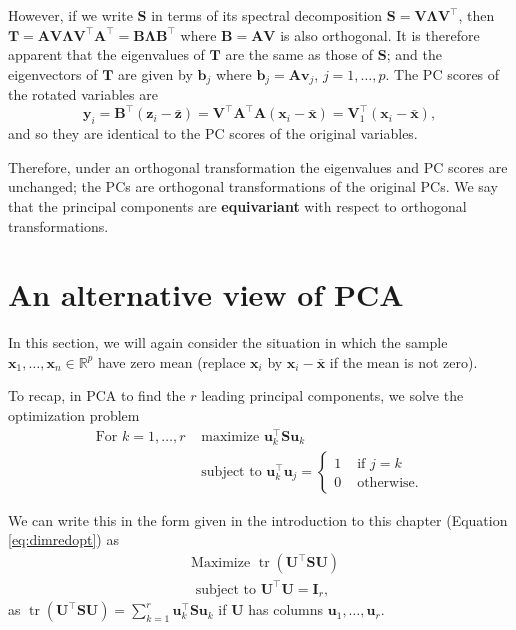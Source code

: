 \documentclass[]{book}
\theoremstyle{definition}
\theoremstyle{definition}
\theoremstyle{definition}
\theoremstyle{remark}
\begin{document}
However, if we write \(\mathbf S\) in terms of its spectral decomposition \(\mathbf S= \mathbf V\boldsymbol \Lambda\mathbf V^\top\), then \(\mathbf T= \mathbf A\mathbf V\boldsymbol \Lambda\mathbf V^\top \mathbf A^\top = \mathbf B\boldsymbol \Lambda\mathbf B^\top\) where \(\mathbf B= \mathbf A\mathbf V\) is also orthogonal. It is therefore apparent that the eigenvalues of \(\mathbf T\) are the same as those of \(\mathbf S\); and the eigenvectors of \(\mathbf T\) are given by \(\mathbf b_j\) where \(\mathbf b_j = \mathbf A\mathbf v_j\), \(j=1,\ldots,p\). The PC scores of the rotated variables are
\[ \mathbf y_i = \mathbf B^\top (\mathbf z_i - \bar{\mathbf z}) = \mathbf V^\top \mathbf A^\top \mathbf A(\mathbf x_i - \bar{\mathbf x}) = \mathbf V_1^\top (\mathbf x_i - \bar{\mathbf x}),\]
and so they are identical to the PC scores of the original variables.

Therefore, under an orthogonal transformation the eigenvalues and PC scores are unchanged; the PCs are orthogonal transformations of the original PCs. We say that the principal components are \textbf{equivariant} with respect to orthogonal transformations.

\hypertarget{an-alternative-view-of-pca}{%
\section{An alternative view of PCA}\label{an-alternative-view-of-pca}}

In this section, we will again consider the situation in which the sample \(\mathbf x_1, \ldots , \mathbf x_n \in \mathbb{R}^p\) have zero mean (replace \(\mathbf x_i\) by \(\mathbf x_i-\bar{\mathbf x}\) if the mean is not zero).

To recap, in PCA to find the \(r\) leading principal components, we solve the optimization problem
\begin{align*}
\mbox{For } k=1, \ldots, r &\mbox{ maximize } \mathbf u_k^\top \mathbf S\mathbf u_k \\
 &\mbox{ subject to } \mathbf u_k^\top \mathbf u_j = \begin{cases}
 1  &\mbox{ if } j=k\\
 0 & \mbox{ otherwise.}
 \end{cases}
 \end{align*}

We can write this in the form given in the introduction to this chapter (Equation \eqref{eq:dimredopt}) as
\begin{align*}
&\mbox{Maximize } \operatorname{tr}(\mathbf U^\top \mathbf S\mathbf U) \\
 &\mbox{ subject to } \mathbf U^\top \mathbf U=\mathbf I_r,
 \end{align*}
as \(\operatorname{tr}(\mathbf U^\top \mathbf S\mathbf U) = \sum_{k=1}^r \mathbf u_k^\top \mathbf S\mathbf u_k\) if \(\mathbf U\) has columns \(\mathbf u_1, \ldots, \mathbf u_r\).
\end{document}
